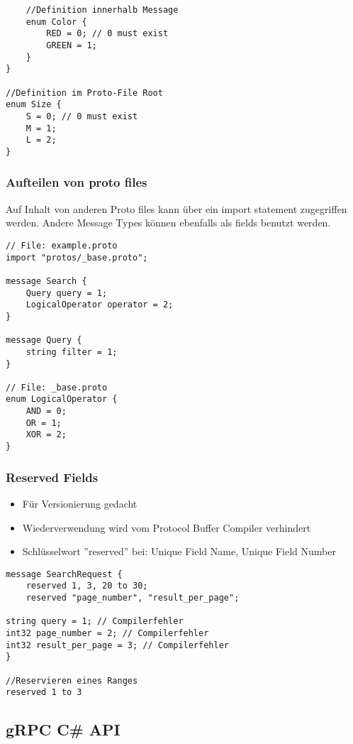 \begin{multicols*}{2}
\begin{lstlisting}
    //Definition innerhalb Message
    enum Color {
        RED = 0; // 0 must exist
        GREEN = 1;
    }
}

//Definition im Proto-File Root
enum Size {
    S = 0; // 0 must exist 
    M = 1;
    L = 2;
}
\end{lstlisting}
\subsubsection{Aufteilen von proto files}
Auf Inhalt von anderen Proto files kann über ein import statement zugegriffen werden.
Andere Message Types können ebenfalls als fields benutzt werden.
\begin{lstlisting}
// File: example.proto
import "protos/_base.proto";

message Search {
    Query query = 1;
    LogicalOperator operator = 2;
}

message Query {
    string filter = 1;
}

// File: _base.proto
enum LogicalOperator {
    AND = 0;
    OR = 1;
    XOR = 2; 
}
\end{lstlisting}
\subsubsection{Reserved Fields}
\begin{itemize}
    \item Für Versionierung gedacht
    \item Wiederverwendung wird vom Protocol Buffer Compiler verhindert
    \item Schlüsselwort ''reserved'' bei: Unique Field Name, Unique Field Number
\end{itemize}
\begin{lstlisting}
message SearchRequest { 
    reserved 1, 3, 20 to 30; 
    reserved "page_number", "result_per_page";

string query = 1; // Compilerfehler
int32 page_number = 2; // Compilerfehler
int32 result_per_page = 3; // Compilerfehler
}

//Reservieren eines Ranges
reserved 1 to 3
\end{lstlisting}

\subsection{gRPC C\# API}

\end{multicols*}
